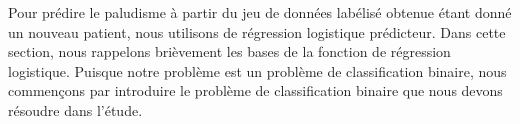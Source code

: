 
Pour prédire le paludisme à partir du jeu de données labélisé obtenue étant donné un nouveau patient, nous utilisons de régression logistique prédicteur. Dans cette section, nous rappelons brièvement les bases de la fonction de régression logistique. Puisque notre problème est un problème de classification binaire, nous commençons par introduire le problème de classification binaire que nous devons résoudre dans l'étude.
